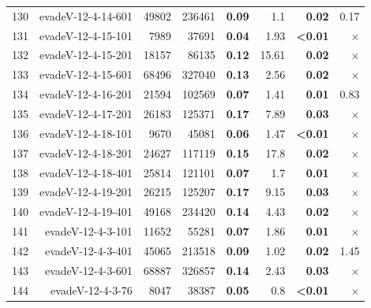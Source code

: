\begin{longtable}{lrr@{\hskip 12pt}r@{\hskip 12pt}r@{\hskip 12pt}r@{\hskip 12pt}r@{\hskip 12pt}r}
130 & \multirow{1}{*}{evadeV-12-4-14-601} & \multirow{1}{*}{49802} & \multirow{1}{*}{236461} & \textbf{0.09} & 1.1 & \textbf{0.02} & 0.17 \\
131 & \multirow{1}{*}{evadeV-12-4-15-101} & \multirow{1}{*}{7989} & \multirow{1}{*}{37691} & \textbf{0.04} & 1.93 & \textbf{<0.01} & $\times$ \\
132 & \multirow{1}{*}{evadeV-12-4-15-201} & \multirow{1}{*}{18157} & \multirow{1}{*}{86135} & \textbf{0.12} & 15.61 & \textbf{0.02} & $\times$ \\
133 & \multirow{1}{*}{evadeV-12-4-15-601} & \multirow{1}{*}{68496} & \multirow{1}{*}{327040} & \textbf{0.13} & 2.56 & \textbf{0.02} & $\times$ \\
134 & \multirow{1}{*}{evadeV-12-4-16-201} & \multirow{1}{*}{21594} & \multirow{1}{*}{102569} & \textbf{0.07} & 1.41 & \textbf{0.01} & 0.83 \\
135 & \multirow{1}{*}{evadeV-12-4-17-201} & \multirow{1}{*}{26183} & \multirow{1}{*}{125371} & \textbf{0.17} & 7.89 & \textbf{0.03} & $\times$ \\
136 & \multirow{1}{*}{evadeV-12-4-18-101} & \multirow{1}{*}{9670} & \multirow{1}{*}{45081} & \textbf{0.06} & 1.47 & \textbf{<0.01} & $\times$ \\
137 & \multirow{1}{*}{evadeV-12-4-18-201} & \multirow{1}{*}{24627} & \multirow{1}{*}{117119} & \textbf{0.15} & 17.8 & \textbf{0.02} & $\times$ \\
138 & \multirow{1}{*}{evadeV-12-4-18-401} & \multirow{1}{*}{25814} & \multirow{1}{*}{121101} & \textbf{0.07} & 1.7 & \textbf{0.01} & $\times$ \\
139 & \multirow{1}{*}{evadeV-12-4-19-201} & \multirow{1}{*}{26215} & \multirow{1}{*}{125207} & \textbf{0.17} & 9.15 & \textbf{0.03} & $\times$ \\
140 & \multirow{1}{*}{evadeV-12-4-19-401} & \multirow{1}{*}{49168} & \multirow{1}{*}{234420} & \textbf{0.14} & 4.43 & \textbf{0.02} & $\times$ \\
141 & \multirow{1}{*}{evadeV-12-4-3-101} & \multirow{1}{*}{11652} & \multirow{1}{*}{55281} & \textbf{0.07} & 1.86 & \textbf{0.01} & $\times$ \\
142 & \multirow{1}{*}{evadeV-12-4-3-401} & \multirow{1}{*}{45065} & \multirow{1}{*}{213518} & \textbf{0.09} & 1.02 & \textbf{0.02} & 1.45 \\
143 & \multirow{1}{*}{evadeV-12-4-3-601} & \multirow{1}{*}{68887} & \multirow{1}{*}{326857} & \textbf{0.14} & 2.43 & \textbf{0.03} & $\times$ \\
144 & \multirow{1}{*}{evadeV-12-4-3-76} & \multirow{1}{*}{8047} & \multirow{1}{*}{38387} & \textbf{0.05} & 0.8 & \textbf{<0.01} & $\times$ \\

\end{longtable}
